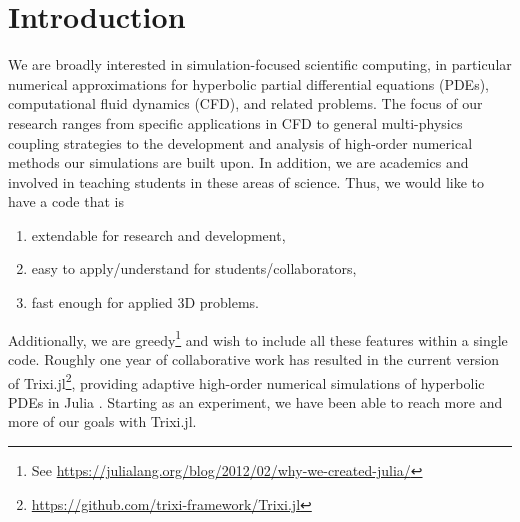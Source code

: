 \documentclass[hidelinks]{juliacon} %
\newcommand{\trixi}{Trixi.jl\xspace}
\begin{document}


\maketitle

\begin{abstract}
We present Trixi.jl, a Julia package for adaptive high-order numerical simulations
of hyperbolic partial differential equations (PDEs). Utilizing Julia's strengths,
Trixi.jl is extendable, easy to use, and fast. We describe the main design choices
that enable these features and compare Trixi.jl with an established open
source Fortran code for hyperbolic PDEs using the same numerical methods.
We conclude with an assessment of Julia for simulation-focused scientific
computing, an area that is still dominated by traditional high-performance
computing languages such as C, C++, and Fortran.
\end{abstract}


\section{Introduction}

We are broadly interested in simulation-focused scientific computing, in particular
numerical approximations for hyperbolic partial differential equations (PDEs), computational fluid dynamics (CFD),
and related problems. The focus of our research ranges from specific applications
in CFD to general multi-physics coupling strategies to the development and analysis of high-order numerical methods
our simulations are built upon. In addition, we are academics and involved in teaching
students in these areas of science. Thus, we would like to have a
code that is
\begin{enumerate}
  \item extendable for research and development,
  \item easy to apply/understand for students/collaborators,
  \item fast enough for applied 3D problems.
\end{enumerate}
Additionally, we are greedy\footnote{See \url{https://julialang.org/blog/2012/02/why-we-created-julia/}}
and wish to include all these features within a single code.
Roughly one year of collaborative work has resulted in the current version of
\trixi\footnote{\url{https://github.com/trixi-framework/Trixi.jl}}, providing adaptive
high-order numerical simulations of hyperbolic PDEs
in Julia \cite{bezanson2017julia}. Starting as an experiment, we have been able
to reach more and more of our goals with \trixi.
\end{document}

